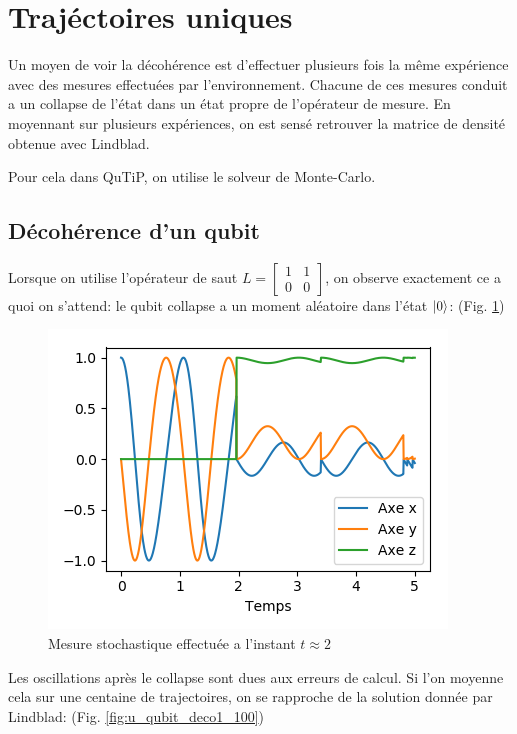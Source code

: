 \documentclass[11pt,a4paper]{article}
\newcommand{\q}{q\hspace{-0.5ex}u}
\begin{document}
	\section{Trajéctoires uniques}
	
	Un moyen de voir la décohérence est d'effectuer plusieurs fois la même expérience avec des mesures effectuées par l'environnement. Chacune de ces mesures conduit a un collapse de l'état dans un état propre de l'opérateur de mesure.
	En moyennant sur plusieurs expériences, on est sensé retrouver la matrice de densité obtenue avec Lindblad.
	
	Pour cela dans QuTiP, on utilise le solveur de Monte-Carlo.
	
	\subsection{Décohérence d'un \q bit}
	Lorsque on utilise l'opérateur de saut $L=\left[\begin{matrix}
	1&1\\0&0
	\end{matrix}\right]$, on observe exactement ce a quoi on s'attend: le \q bit collapse a un moment aléatoire dans l'état $\ket{0}$:  (Fig. \ref{fig:u_qubit_deco2})
	\begin{figure}
		\centering
		\includegraphics[width=0.7\linewidth]{U_Qubit_deco1}
		\caption{Mesure stochastique effectuée a l'instant $t\approx 2$}
		\label{fig:u_qubit_deco2}
	\end{figure}
	Les oscillations après le collapse sont dues aux erreurs de calcul.
	Si l'on moyenne cela sur une centaine de trajectoires, on se rapproche de la solution donnée par Lindblad: (Fig. \ref{fig:u_qubit_deco1_100})
\end{document}
